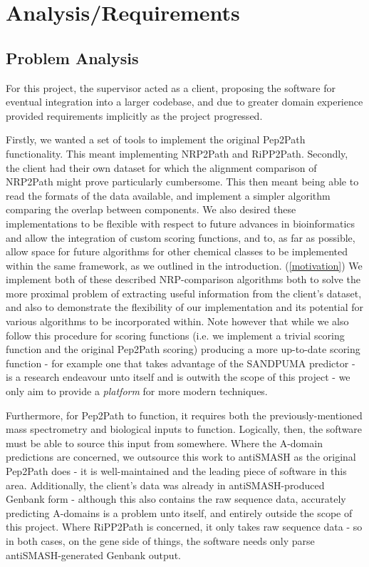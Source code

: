 \documentclass{l4proj}
\begin{document}
\chapter{Analysis/Requirements}

\section{Problem Analysis}

For this project, the supervisor acted as a client, proposing the software for eventual integration into a larger codebase, and due to greater domain experience provided requirements implicitly as the project progressed. 

Firstly, we wanted a set of tools to implement the original Pep2Path functionality. This meant implementing NRP2Path and RiPP2Path. Secondly, the client had their own dataset for which the alignment comparison of NRP2Path might prove particularly cumbersome. This then meant being able to read the formats of the data available, and implement a simpler algorithm comparing the overlap between components. We also desired these implementations to be flexible with respect to future advances in bioinformatics and allow the integration of custom scoring functions, and to, as far as possible, allow space for future algorithms for other chemical classes to be implemented within the same framework, as we outlined in the introduction. (\ref{motivation}) We implement both of these described NRP-comparison algorithms both to solve the more proximal problem of extracting useful information from the client's dataset, and also to demonstrate the flexibility of our implementation and its potential for various algorithms to be incorporated within. Note however that while we also follow this procedure for scoring functions (i.e. we implement a trivial scoring function and the original Pep2Path scoring) producing a more up-to-date scoring function - for example one that takes advantage of the SANDPUMA predictor - is a research endeavour unto itself and is outwith the scope of this project - we only aim to provide a \textit{platform} for more modern techniques.

Furthermore, for Pep2Path to function, it requires both the previously-mentioned mass spectrometry and biological inputs to function. Logically, then, the software must be able to source this input from somewhere. Where the A-domain predictions are concerned, we outsource this work to antiSMASH as the original Pep2Path does - it is well-maintained and the leading piece of software in this area. Additionally, the client's data was already in antiSMASH-produced Genbank form - although this also contains the raw sequence data, accurately predicting A-domains is a problem unto itself, and entirely outside the scope of this project. Where RiPP2Path is concerned, it only takes raw sequence data - so in both cases, on the gene side of things, the software needs only parse antiSMASH-generated Genbank output.
\end{document}
